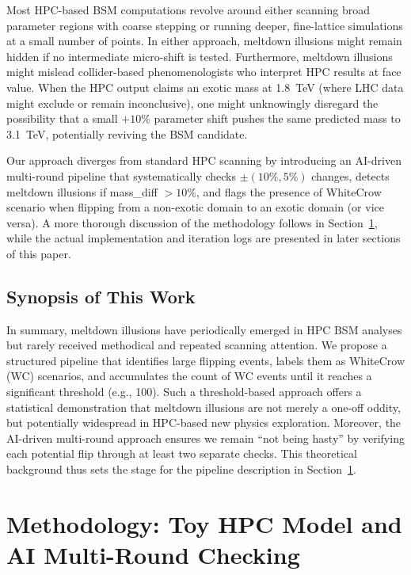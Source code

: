\documentclass[11pt]{article}
\begin{document}
Most HPC-based BSM computations revolve around 
either scanning broad parameter regions with coarse stepping 
or running deeper, fine-lattice simulations at a small number of points. 
In either approach, meltdown illusions might remain hidden 
if no intermediate micro-shift is tested. 
Furthermore, meltdown illusions might mislead 
collider-based phenomenologists 
who interpret HPC results at face value. 
When the HPC output claims an exotic mass at 1.8~TeV 
(where LHC data might exclude or remain inconclusive), 
one might unknowingly disregard 
the possibility that a small $+10\%$ parameter shift 
pushes the same predicted mass to 3.1~TeV, 
potentially reviving the BSM candidate.

Our approach diverges from standard HPC scanning 
by introducing an AI-driven multi-round pipeline 
that systematically checks $\pm (10\%, 5\%)$ changes, 
detects meltdown illusions if mass\_diff $> 10\%$, 
and flags the presence of WhiteCrow scenario 
when flipping from a non-exotic domain to an exotic domain 
(or vice versa). A more thorough discussion 
of the methodology follows in Section~\ref{sec:methodology}, 
while the actual implementation and iteration logs 
are presented in later sections of this paper.

\subsection{Synopsis of This Work}

In summary, meltdown illusions have periodically emerged 
in HPC BSM analyses but rarely received methodical 
and repeated scanning attention. We propose 
a structured pipeline that identifies large flipping events, 
labels them as WhiteCrow (WC) scenarios, 
and accumulates the count of WC events 
until it reaches a significant threshold (e.g., 100). 
Such a threshold-based approach offers a statistical demonstration 
that meltdown illusions are not merely a one-off oddity, 
but potentially widespread in HPC-based new physics exploration. 
Moreover, the AI-driven multi-round approach ensures 
we remain ``not being hasty'' by verifying each potential flip 
through at least two separate checks. 
This theoretical background thus sets the stage for the pipeline description in Section~\ref{sec:methodology}.


\section{Methodology: Toy HPC Model and AI Multi-Round Checking}
\label{sec:methodology}
\end{document}
